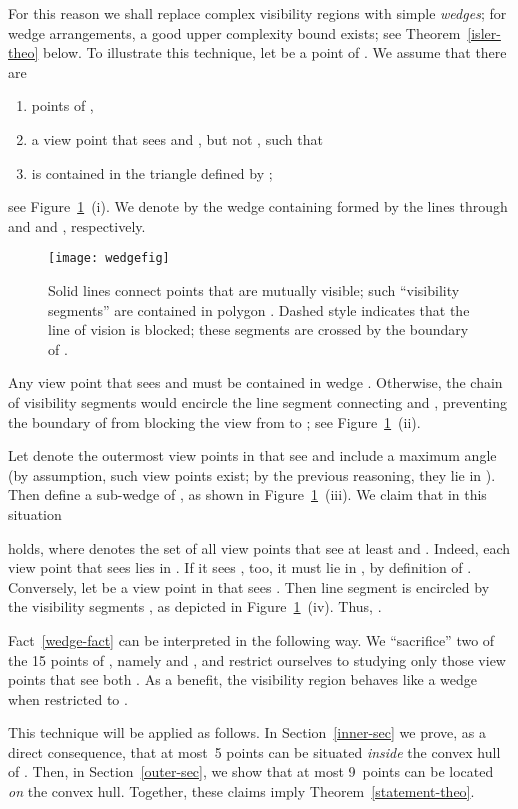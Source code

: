 \documentclass[11pt]{article}
\begin{document}
For this reason we shall replace complex visibility regions with simple {\em wedges};
for wedge arrangements, a good upper complexity bound exists; see Theorem~\ref{isler-theo} below.
To illustrate this technique, let  be a point of . We assume that there are 
\begin{enumerate}
\item  points  of ,
\item  a view point  that sees  and , but not , such that
\item   is contained in the  triangle defined by ;
\end{enumerate}
see Figure~\ref{wedge-fig}~(i). We denote by  the wedge containing  formed 
by the lines through  and  and , respectively.
\begin{figure}[hbtp]\begin{center}\texttt{[image: wedgefig]}\caption{Solid lines connect points that are mutually visible; such ``visibility segments''  
    are contained in polygon . Dashed style indicates that the line of vision
    is blocked; these segments are crossed by the boundary of .}\label{wedge-fig}
  \end{center}\end{figure}
Any view point  that sees  and  must be contained in wedge . Otherwise, the chain of
visibility segments  would encircle the line segment  connecting  and , 
preventing the boundary of  from blocking the view from  to ; see Figure~\ref{wedge-fig}~(ii). 

Let  denote the outermost view points in  that see  and include a maximum angle
(by assumption, such view points exist; by the previous reasoning, they lie in ).
Then  define a sub-wedge  of , as shown in Figure~\ref{wedge-fig}~(iii). 
We claim that in this situation

holds, where  denotes the set of all view points that see at least  and .
Indeed, each view point that sees  lies in . If it sees , too, it must lie in ,
by definition of . Conversely, let  be a view point in  that sees . Then line segment
 is encircled by the visibility segments ,
as depicted in Figure~\ref{wedge-fig}~(iv). Thus, .

Fact~\ref{wedge-fact} can be interpreted in the following way. We ``sacrifice'' two of the 15 points of ,
namely  and , and restrict ourselves to studying only those  view points  
that see both .  As a benefit, the visibility region  behaves like a wedge
when restricted to .

This technique will be applied as follows.
In Section~\ref{inner-sec} we prove, as a direct consequence, that at most~5 points can be situated {\em inside} the 
convex hull of . Then, in Section~\ref{outer-sec}, we show that at most 9~points can be located {\em on} the
convex hull. Together, these claims imply Theorem~\ref{statement-theo}.
\end{document}
